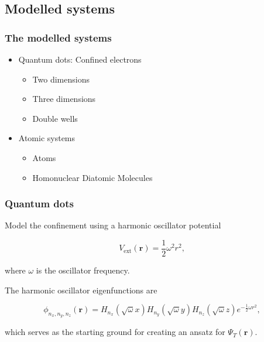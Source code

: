 \subsection{Modelled systems}

\begin{frame}
 \frametitle{The modelled systems}
 \begin{itemize}
  \item Quantum dots: Confined electrons
  \begin{itemize}
  \item Two dimensions
  \item Three dimensions
  \item Double wells
  \end{itemize}
  \pause
  \item Atomic systems
  \begin{itemize}
  \item Atoms
  \item Homonuclear Diatomic Molecules
  \end{itemize}
 \end{itemize}
\end{frame}

\begin{frame}
 \frametitle{Quantum dots}
 
 Model the confinement using a harmonic oscillator potential
 
 \begin{equation*}
  V_\mathrm{ext}(\mathbf{r}) = \frac{1}{2}\omega^2r^2,
 \end{equation*}
 
 where $\omega$ is the oscillator frequency.
 
 \pause
 
 The harmonic oscillator eigenfunctions are
 
 \begin{equation*}
  \phi_{n_x, n_y, n_z}(\mathbf{r}) = H_{n_x}(\sqrt{\omega}x)H_{n_y}(\sqrt{\omega}y)H_{n_z}(\sqrt{\omega}z)e^{-\frac{1}{2}\omega r^2},
 \end{equation*}
 
 which serves as the starting ground for creating an ansatz for $\Psi_T(\mathbf{r})$.


 
\end{frame}

%  
%  
%  
% 
%  
%  

